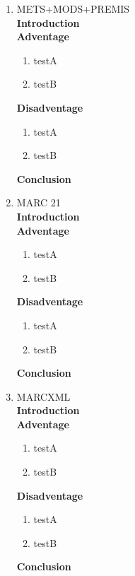 \documentclass[a4paper]{article}
\begin{document}
\begin{enumerate}
	\item METS+MODS+PREMIS\\
	{\bf Introduction}\\
	
	{\bf Adventage}
	\begin{enumerate}
		\item testA
		\item testB
	\end{enumerate}	
	{\bf Disadventage}
	\begin{enumerate}
		\item testA
		\item testB
	\end{enumerate}
	{\bf Conclusion}\\
	
	\item MARC 21\\
	{\bf Introduction}\\
	
	{\bf Adventage}
	\begin{enumerate}
		\item testA
		\item testB	
	\end{enumerate}	
	{\bf Disadventage}
	\begin{enumerate}
		\item testA
		\item testB
	\end{enumerate}
	{\bf Conclusion}\\
	
	\item MARCXML\\
	{\bf Introduction}\\
	
	{\bf Adventage}
	\begin{enumerate}
		\item testA
		\item testB
	\end{enumerate}	
	{\bf Disadventage}
	\begin{enumerate}
		\item testA
		\item testB
	\end{enumerate}
	{\bf Conclusion}\\
	

\end{enumerate}
\end{document}
